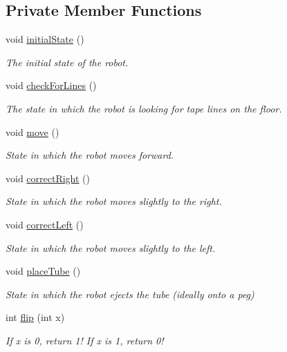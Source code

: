 \subsection*{Private Member Functions}
\begin{DoxyCompactItemize}
\item 
void \hyperlink{class_r_j_f_r_c2011_1_1_autonomous_a1f04427d07d9569a9f746445c82b8173}{initialState} ()
\begin{DoxyCompactList}\small\item\em The initial state of the robot. \item\end{DoxyCompactList}\item 
void \hyperlink{class_r_j_f_r_c2011_1_1_autonomous_a19885a005434b857e127132a8b871cbe}{checkForLines} ()
\begin{DoxyCompactList}\small\item\em The state in which the robot is looking for tape lines on the floor. \item\end{DoxyCompactList}\item 
void \hyperlink{class_r_j_f_r_c2011_1_1_autonomous_aa3128360e2ac480a3e3ed89e2aeda31b}{move} ()
\begin{DoxyCompactList}\small\item\em State in which the robot moves forward. \item\end{DoxyCompactList}\item 
void \hyperlink{class_r_j_f_r_c2011_1_1_autonomous_acf0141adb70da7e5fe52c5597c0ad34f}{correctRight} ()
\begin{DoxyCompactList}\small\item\em State in which the robot moves slightly to the right. \item\end{DoxyCompactList}\item 
void \hyperlink{class_r_j_f_r_c2011_1_1_autonomous_a04da5791b6204403806e04d6a02ad48f}{correctLeft} ()
\begin{DoxyCompactList}\small\item\em State in which the robot moves slightly to the left. \item\end{DoxyCompactList}\item 
void \hyperlink{class_r_j_f_r_c2011_1_1_autonomous_af0c3a743192b8ba41280999752a1e7da}{placeTube} ()
\begin{DoxyCompactList}\small\item\em State in which the robot ejects the tube (ideally onto a peg) \item\end{DoxyCompactList}\item 
int \hyperlink{class_r_j_f_r_c2011_1_1_autonomous_a71e3ba11ca9e1f84b324a785d1f7985a}{flip} (int x)
\begin{DoxyCompactList}\small\item\em If x is 0, return 1! If x is 1, return 0! \item\end{DoxyCompactList}\end{DoxyCompactItemize}
